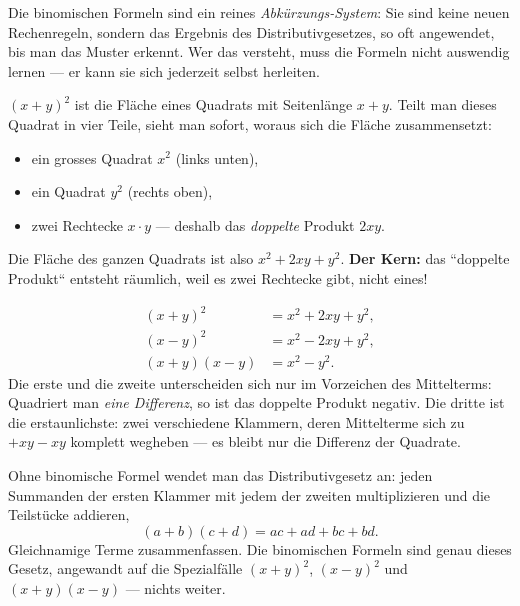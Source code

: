 


Die binomischen Formeln sind ein reines \emph{Abkürzungs-System}: Sie
sind keine neuen Rechenregeln, sondern das Ergebnis des
Distributivgesetzes, so oft angewendet, bis man das Muster erkennt. Wer
das versteht, muss die Formeln nicht auswendig lernen --- er kann sie sich
jederzeit selbst herleiten.

\begin{werkzeugkasten}[Warum $(x+y)^2=x^2+2xy+y^2$? --- das Flächenbild]
$(x+y)^2$ ist die Fläche eines Quadrats mit Seitenlänge $x+y$. Teilt man
dieses Quadrat in vier Teile, sieht man sofort, woraus sich die Fläche
zusammensetzt:
\begin{itemize}
  \item ein grosses Quadrat $x^2$ (links unten),
  \item ein Quadrat $y^2$ (rechts oben),
  \item zwei Rechtecke $x\cdot y$ --- deshalb das \emph{doppelte} Produkt
        $2xy$.
\end{itemize}
Die Fläche des ganzen Quadrats ist also $x^2+2xy+y^2$. \textbf{Der Kern:}
das ``doppelte Produkt`` entsteht räumlich, weil es zwei Rechtecke gibt,
nicht eines!
\end{werkzeugkasten}

\begin{werkzeugkasten}
\begin{align}
  (x+y)^2 &= x^2+2xy+y^2, \\
  (x-y)^2 &= x^2-2xy+y^2, \\
  (x+y)(x-y) &= x^2-y^2 .
\end{align}
Die erste und die zweite unterscheiden sich nur im Vorzeichen des
Mittelterms: Quadriert man \emph{eine Differenz}, so ist das doppelte
Produkt negativ. Die dritte ist die erstaunlichste: zwei verschiedene
Klammern, deren Mittelterme sich zu $+xy-xy$ komplett wegheben --- es
bleibt nur die Differenz der Quadrate.
\end{werkzeugkasten}

\begin{werkzeugkasten}
Ohne binomische Formel wendet man das Distributivgesetz an: jeden
Summanden der ersten Klammer mit jedem der zweiten multiplizieren und
die Teilstücke addieren,
\begin{equation}
  (a+b)(c+d)=ac+ad+bc+bd .
\end{equation}
Gleichnamige Terme zusammenfassen. Die binomischen Formeln sind genau
dieses Gesetz, angewandt auf die Spezialfälle $(x+y)^2$, $(x-y)^2$ und
$(x+y)(x-y)$ --- nichts weiter.
\end{werkzeugkasten}

